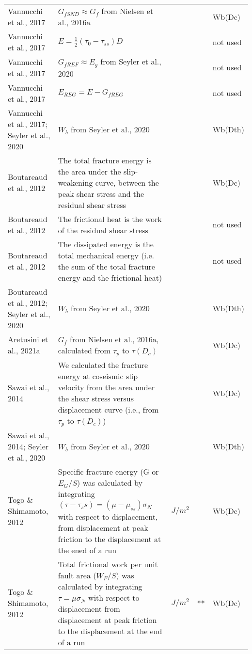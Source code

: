 \documentclass{article}
\begin{document}
\begin{longtable}{|p{4 cm}|p{8 cm}|p{1.25 cm}|p{1.25 cm}|p{1.5 cm}|}
Vannucchi et al., 2017 & \( \displaystyle G_{fSND} \approx G_f\) from Nielsen et al., 2016a & & & Wb(Dc) \\
Vannucchi et al., 2017 & \( \displaystyle E = \frac{1}{2} (\tau_0 - \tau_{ss}) D \) & & & not used \\
Vannucchi et al., 2017 & \( \displaystyle G_{fREF} \approx E_g \) from Seyler et al., 2020 & & & not used \\
Vannucchi et al., 2017 & \( \displaystyle E_{REG} = E - G_{fREG} \) & & & not used \\
Vannucchi et al., 2017; Seyler et al., 2020 & \( \displaystyle W_b \) from Seyler et al., 2020 & & & Wb(Dth) \\
Boutareaud et al., 2012 & The total fracture energy is the area under the slip-weakening curve, between the peak shear stress and the residual shear stress & & & Wb(Dc) \\
Boutareaud et al., 2012 & The frictional heat is the work of the residual shear stress & & & not used \\
Boutareaud et al., 2012 & The dissipated energy is the total mechanical energy (i.e. the sum of the total fracture energy and the frictional heat) & & & not used \\
Boutareaud et al., 2012; Seyler et al., 2020 & \( \displaystyle W_b \) from Seyler et al., 2020 & & & Wb(Dth) \\
Aretusini et al., 2021a & \( \displaystyle G_f\) from Nielsen et al., 2016a, calculated from $\tau_p$ to $\tau(D_c)$ & & & Wb(Dc) \\
Sawai et al., 2014 & We calculated the fracture energy at coseismic slip velocity from the area under the shear stress versus displacement curve (i.e., from $\tau_p$ to $\tau(D_c)$) & & & Wb(Dc) \\
Sawai et al., 2014; Seyler et al., 2020 & \( \displaystyle W_b \) from Seyler et al., 2020 & & & Wb(Dth) \\
Togo \& Shimamoto, 2012 & Specific fracture energy (G or $E_G/S$) was calculated by integrating $(\tau-\tau_ss) = (\mu - \mu_{ss})\sigma_N$ with respect to displacement, from displacement at peak friction to the displacement at the ened of a run & $J/m^2$ & & Wb(Dc) \\
Togo \& Shimamoto, 2012 & Total frictional work per unit fault area ($W_F/S$) was calculated by integrating $\tau = \mu \sigma_N$ with respect to displacement from displacement at peak friction to the displacement at the end of a run & $J/m^2$ & ** & Wb(Dc) \\

\end{longtable}
\end{document}

